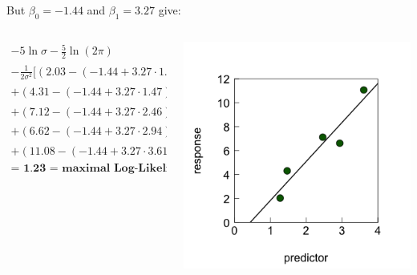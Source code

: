 \documentclass{beamer}
\begin{document}
\begin{frame}
    \frametitle{}
    But $\beta_0 = -1.44$ and $\beta_1 = 3.27$ give:
    
    \vspace{0.5cm}
    
    \begin{columns}
        \begin{column}{0.5\textwidth}
            \begin{multline*}
            -5 \ln \sigma - \frac 52 \ln (2 \pi) \\
            - \frac{1}{2 \sigma^2} [( 2.03 - (-1.44 + 3.27 \cdot 1.27))^2 \\
            + ( 4.31 - (-1.44 + 3.27 \cdot 1.47))^2 \\
            + ( 7.12 - (-1.44 + 3.27 \cdot 2.46))^2 \\
            + ( 6.62 - (-1.44 + 3.27 \cdot 2.94))^2 \\
            + ( 11.08 - (-1.44 + 3.27 \cdot 3.61))^2] \\
            \textbf{= 1.23 = maximal Log-Likelihood $\ell$}
            \end{multline*}  
        \end{column}
        
        \begin{column}{0.5\textwidth}
            \centering
            \includegraphics[width=\textwidth]{lectures/day_2_LM_refresh_I/figures/unnamed-chunk-24-1.png}
        \end{column}
    \end{columns}
\end{frame}
\end{document}
